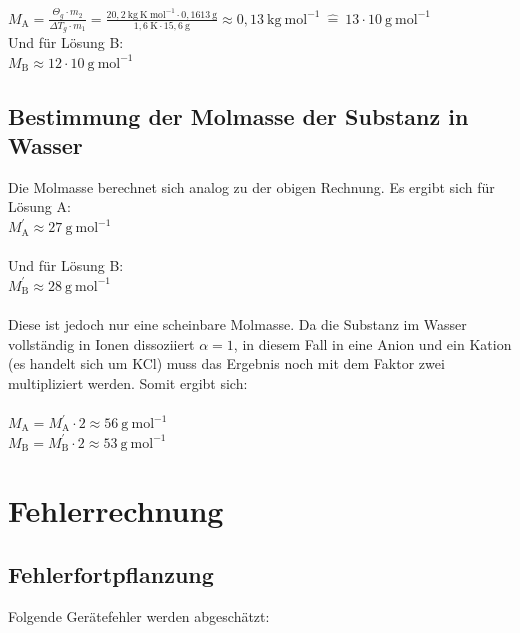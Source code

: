 \documentclass[12pt,a4paper,titlepage,headinclude,bibtotoc]{scrartcl}
\begin{document}
$M_\mathrm{A} = \frac { \Theta_g \cdot m_2 }{ \Delta T_g\cdot m_1} 
 = \frac {20,2{~} \mathrm{kg{~}K {~} mol^{-1}} \cdot 0,1613 {~}\text{g}} { 1,6 {~} \mathrm{K} \cdot 15,6{~} \mathrm{g}} \approx 0,13{~} \mathrm{kg {~} mol^{-1}} {~}\widehat{=}{~} 13 \cdot 10{~} \mathrm{g{~}mol^{-1}} $\\

Und für Lösung B:\\

$M_\mathrm{B} \approx 12 \cdot 10{~} \mathrm{g{~}mol^{-1}}$


\subsection{Bestimmung der Molmasse der Substanz in Wasser}

Die Molmasse berechnet sich analog zu der obigen Rechnung. Es ergibt sich für Lösung A:\\
$M_\mathrm{A}^{'} \approx 27{~} \mathrm{g{~}mol^{-1}}$\\\\
Und für Lösung B:\\
$M_\mathrm{B}^{'} \approx 28{~} \mathrm{g{~}mol^{-1}}$\\\\

Diese ist jedoch nur eine scheinbare Molmasse. Da die Substanz im Wasser vollständig  in Ionen dissoziiert $\alpha = 1$, in diesem Fall in eine Anion und ein Kation (es handelt sich um KCl) muss das Ergebnis noch mit dem Faktor zwei multipliziert werden. Somit ergibt sich:\\\\
$M_\mathrm{A} = M_\mathrm{A}^{'} \cdot 2 \approx 56{~} \mathrm{g{~}mol^{-1}} $\\
$M_\mathrm{B} = M_\mathrm{B}^{'} \cdot 2 \approx 53{~} \mathrm{g{~}mol^{-1}} $\\

\section{Fehlerrechnung}
\subsection{Fehlerfortpflanzung}
Folgende Gerätefehler werden abgeschätzt:\\
\end{document}
